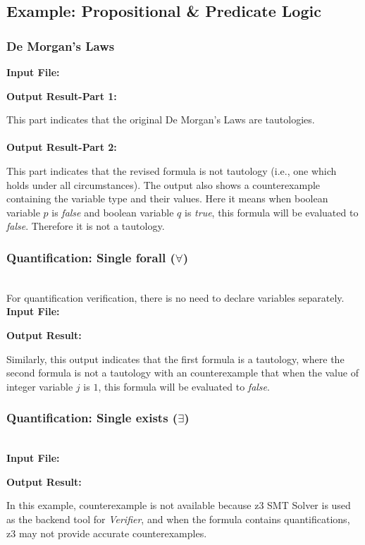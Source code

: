 


\subsection{Example: Propositional \& Predicate Logic}

\subsubsection{De Morgan's Laws}
{\bf Input File:}

{\bf Output Result-Part 1:}

\hspace{4mm}{\bf Part 1:} This part indicates that the original De Morgan's Laws are tautologies. \\\\
{\bf Output Result-Part 2:}

\hspace{4mm}{\bf Part 2:} This part indicates that the revised formula is not tautology (i.e., one which holds under all circumstances). The output also shows a counterexample containing the variable type and their values. Here it means when boolean variable $p$ is \emph{false} and boolean variable $q$ is \emph{true}, this formula will be evaluated to \emph{false}. Therefore it is not a tautology.
\subsubsection{Quantification: Single forall ($\forall$)}
~\\For quantification verification, there is no need to declare variables separately.
{\bf Input File:}

{\bf Output Result:}

\hspace{4mm}Similarly, this output indicates that the first formula is a tautology, where the second formula is not a tautology with an counterexample that when the value of integer variable $j$ is $1$, this formula will be evaluated to \emph{false}. \\


\subsubsection{Quantification: Single exists ($\exists$)}
~\\
{\bf Input File:}

{\bf Output Result:}

\hspace{4mm}In this example, counterexample is not available because z3 SMT Solver is used as the backend tool for \emph{Verifier}, and when the formula contains quantifications, z3 may not provide accurate counterexamples.

